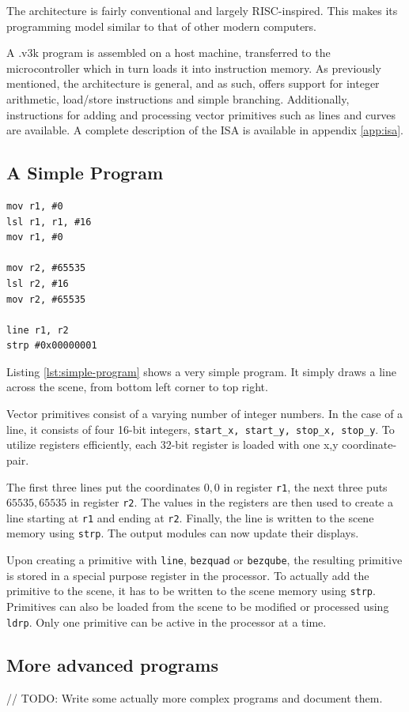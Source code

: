 The \vthreek architecture is fairly conventional and largely RISC-inspired.
This makes its programming model similar to that of other modern computers.

A .v3k program is assembled on a host machine, transferred to the microcontroller which in turn loads it into instruction memory.
As previously mentioned, the \vthreek architecture is general, and as such, offers support for integer arithmetic, load/store instructions and simple branching.
Additionally, instructions for adding and processing vector primitives such as lines and curves are available.
A complete description of the \vthreek ISA is available in appendix \ref{app:isa}.

\subsection{A Simple \vthreek Program}

\begin{lstlisting}[label=lst:simple-program]
mov r1, #0
lsl r1, r1, #16
mov r1, #0

mov r2, #65535
lsl r2, #16
mov r2, #65535

line r1, r2
strp #0x00000001
\end{lstlisting}

Listing \ref{lst:simple-program} shows a very simple \vthreek program.
It simply draws a line across the scene, from bottom left corner to top right.

Vector primitives consist of a varying number of integer numbers.
In the case of a line, it consists of four 16-bit integers, \texttt{start\_x, start\_y, stop\_x, stop\_y}.
To utilize registers efficiently, each 32-bit register is loaded with one x,y coordinate-pair.

The first three lines put the coordinates $0,0$ in register \texttt{r1}, the next three puts $65535,65535$ in register \texttt{r2}.
The values in the registers are then used to create a line starting at \texttt{r1} and ending at \texttt{r2}.
Finally, the line is written to the scene memory using \texttt{strp}.
The output modules can now update their displays.

Upon creating a primitive with \texttt{line}, \texttt{bezquad} or \texttt{bezqube}, the resulting primitive is stored in a special purpose register in the processor.
To actually add the primitive to the scene, it has to be written to the scene memory using \texttt{strp}.
Primitives can also be loaded from the scene to be modified or processed using \texttt{ldrp}.
Only one primitive can be active in the processor at a time.

\subsection{More advanced programs}

// TODO: Write some actually more complex programs and document them.
